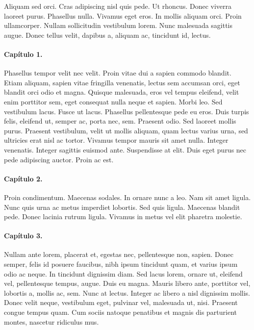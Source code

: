 Aliquam sed orci. Cras adipiscing nisl quis pede. Ut rhoncus. Donec viverra laoreet purus. Phasellus nulla. Vivamus eget eros. In mollis aliquam orci. Proin ullamcorper. Nullam sollicitudin vestibulum lorem. Nunc malesuada sagittis augue. Donec tellus velit, dapibus a, aliquam ac, tincidunt id, lectus.


\paragraph*{Capítulo 1.}
Phasellus tempor velit nec velit. Proin vitae dui a sapien commodo blandit. Etiam aliquam, sapien vitae fringilla venenatis, lectus sem accumsan orci, eget blandit orci odio et magna. Quisque malesuada, eros vel tempus eleifend, velit enim porttitor sem, eget consequat nulla neque et sapien. Morbi leo. Sed vestibulum lacus. Fusce ut lacus. Phasellus pellentesque pede eu eros. Duis turpis felis, eleifend ut, semper ac, porta nec, sem. Praesent odio. Sed laoreet mollis purus. Praesent vestibulum, velit ut mollis aliquam, quam lectus varius urna, sed ultricies erat nisl ac tortor. Vivamus tempor mauris sit amet nulla. Integer venenatis. Integer sagittis euismod ante. Suspendisse at elit. Duis eget purus nec pede adipiscing auctor. Proin ac est.

\paragraph*{Capítulo 2.}
Proin condimentum. Maecenas sodales. In ornare nunc a leo. Nam sit amet ligula. Nunc quis urna ac metus imperdiet lobortis. Sed quis ligula. Maecenas blandit pede. Donec lacinia rutrum ligula. Vivamus in metus vel elit pharetra molestie.

\paragraph*{Capítulo 3.}
Nullam ante lorem, placerat et, egestas nec, pellentesque non, sapien. Donec semper, felis id posuere faucibus, nibh ipsum tincidunt quam, et varius ipsum odio ac neque. In tincidunt dignissim diam. Sed lacus lorem, ornare ut, eleifend vel, pellentesque tempus, augue. Duis eu magna. Mauris libero ante, porttitor vel, lobortis a, mollis ac, sem. Nunc at lectus. Integer ac libero a nisl dignissim mollis. Donec velit neque, vestibulum eget, pulvinar vel, malesuada ut, nisi. Praesent congue tempus quam. Cum sociis natoque penatibus et magnis dis parturient montes, nascetur ridiculus mus.

